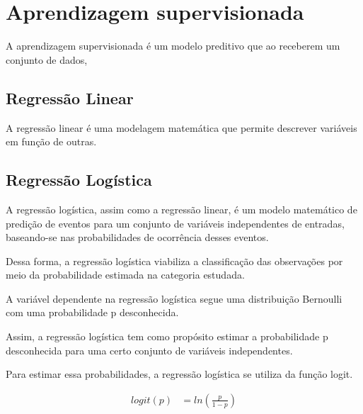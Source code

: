 \section{Aprendizagem supervisionada}
A aprendizagem supervisionada é um modelo preditivo que ao receberem um conjunto de dados, 



\subsection{Regressão Linear}


A regressão linear é uma modelagem matemática \footnotemark {} que permite descrever variáveis em função de outras. 




\subsection{Regressão Logística}

A regressão logística, assim como a regressão linear, é um modelo matemático de predição de eventos para um conjunto de variáveis independentes de entradas, baseando-se nas probabilidades de ocorrência desses eventos. \begin{comment}***As ocorrências desses eventos, por sua vez, são  variáveis binárias dependentes.***\end{comment} Dessa forma, a regressão logística viabiliza a classificação das observações por meio da probabilidade estimada na categoria estudada.

A variável dependente na regressão logística segue uma distribuição Bernoulli com uma probabilidade p desconhecida.

Assim, a regressão logística tem como propósito estimar a probabilidade p desconhecida para uma certo conjunto de variáveis independentes.

Para estimar essa probabilidades, a regressão logística se utiliza da função logit.

\begin{equation}
  \label{eq:t}
  \begin{aligned}
    logit(p) &= ln\left ( \frac{p}{1-p} \right )
  \end{aligned}  
\end{equation}


